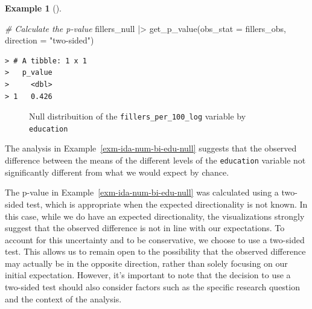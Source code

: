 \documentclass[
  letterpaper,
  DIV=11,
  numbers=noendperiod]{scrreprt}
\newenvironment{Shaded}{\begin{snugshade}}{\end{snugshade}}
\newcommand{\AttributeTok}[1]{\textcolor[rgb]{0.00,0.00,0.00}{#1}}
\newcommand{\CommentTok}[1]{\textcolor[rgb]{0.00,0.00,0.00}{\textit{#1}}}
\newcommand{\FunctionTok}[1]{\textcolor[rgb]{0.00,0.00,0.00}{#1}}
\newcommand{\NormalTok}[1]{\textcolor[rgb]{0.00,0.00,0.00}{#1}}
\newcommand{\SpecialCharTok}[1]{\textcolor[rgb]{0.00,0.00,0.00}{#1}}
\newcommand{\StringTok}[1]{\textcolor[rgb]{0.00,0.00,0.00}{#1}}
\theoremstyle{definition}
\newtheorem{example}{Example}[chapter]
\theoremstyle{remark}
\begin{document}
\begin{example}[]
\begin{Shaded}
\begin{Highlighting}[]
\CommentTok{\# Calculate the p{-}value}
\NormalTok{fillers\_null }\SpecialCharTok{|\textgreater{}}
  \FunctionTok{get\_p\_value}\NormalTok{(}\AttributeTok{obs\_stat =}\NormalTok{ fillers\_obs, }\AttributeTok{direction =} \StringTok{"two{-}sided"}\NormalTok{)}
\end{Highlighting}
\end{Shaded}

\begin{verbatim}
> # A tibble: 1 x 1
>   p_value
>     <dbl>
> 1   0.426
\end{verbatim}

\begin{figure}[H]


\caption{\label{fig-ida-num-bi-edu}Null distribuition of the
\texttt{fillers\_per\_100\_log} variable by \texttt{education}}

\end{figure}%

\end{example}

The analysis in Example~\ref{exm-ida-num-bi-edu-null} suggests that the
observed difference between the means of the different levels of the
\texttt{education} variable not significantly different from what we
would expect by chance.

\begin{tcolorbox}[enhanced jigsaw, leftrule=.75mm, colframe=quarto-callout-color-frame, colback=white, rightrule=.15mm, opacityback=0, arc=.35mm, breakable, bottomrule=.15mm, left=2mm, toprule=.15mm]

The p-value in Example~\ref{exm-ida-num-bi-edu-null} was calculated
using a two-sided test, which is appropriate when the expected
directionality is not known. In this case, while we do have an expected
directionality, the visualizations strongly suggest that the observed
difference is not in line with our expectations. To account for this
uncertainty and to be conservative, we choose to use a two-sided test.
This allows us to remain open to the possibility that the observed
difference may actually be in the opposite direction, rather than solely
focusing on our initial expectation. However, it's important to note
that the decision to use a two-sided test should also consider factors
such as the specific research question and the context of the analysis.

\end{tcolorbox}
\end{document}
